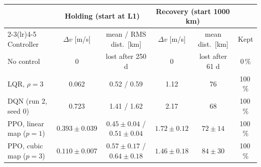 \begin{tabular}{lccccc}
\toprule
& \multicolumn{2}{c}{Holding (start at L1)} & \multicolumn{2}{c}{Recovery (start 1000 km)} & \\
\cmidrule(lr){2-3}\cmidrule(lr){4-5}
Controller & $\Delta v$ [m/s] & mean / RMS dist.\ [km] & $\Delta v$ [m/s] & mean dist.\ [km] & Kept \\
\midrule
No control & 0 & lost after 250 d & 0 & lost after 61 d & 0\,\% \\
LQR, $\rho = 3$ & 0.062 & 0.52 / 0.59 & 1.12 & 76 & 100\,\% \\
DQN (run 2, seed 0) & 0.723 & 1.41 / 1.62 & 2.17 & 68 & 100\,\% \\
PPO, linear map ($p=1$) & $0.393 \pm 0.039$ & $0.45 \pm 0.04$ / $0.51 \pm 0.04$ & $1.72 \pm 0.12$ & $72 \pm 14$ & 100\,\% \\
PPO, cubic map ($p=3$) & $0.110 \pm 0.007$ & $0.57 \pm 0.17$ / $0.64 \pm 0.18$ & $1.46 \pm 0.18$ & $84 \pm 30$ & 100\,\% \\
\bottomrule
\end{tabular}
